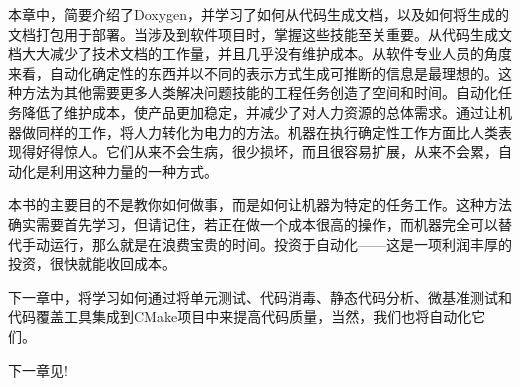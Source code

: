 本章中，简要介绍了Doxygen，并学习了如何从代码生成文档，以及如何将生成的文档打包用于部署。当涉及到软件项目时，掌握这些技能至关重要。从代码生成文档大大减少了技术文档的工作量，并且几乎没有维护成本。从软件专业人员的角度来看，自动化确定性的东西并以不同的表示方式生成可推断的信息是最理想的。这种方法为其他需要更多人类解决问题技能的工程任务创造了空间和时间。自动化任务降低了维护成本，使产品更加稳定，并减少了对人力资源的总体需求。通过让机器做同样的工作，将人力转化为电力的方法。机器在执行确定性工作方面比人类表现得好得惊人。它们从来不会生病，很少损坏，而且很容易扩展，从来不会累，自动化是利用这种力量的一种方式。

本书的主要目的不是教你如何做事，而是如何让机器为特定的任务工作。这种方法确实需要首先学习，但请记住，若正在做一个成本很高的操作，而机器完全可以替代手动运行，那么就是在浪费宝贵的时间。投资于自动化——这是一项利润丰厚的投资，很快就能收回成本。

下一章中，将学习如何通过将单元测试、代码消毒、静态代码分析、微基准测试和代码覆盖工具集成到CMake项目中来提高代码质量，当然，我们也将自动化它们。

下一章见!